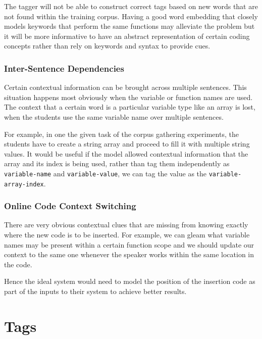 \documentclass[fyp]{socreport}
\begin{document}
The tagger will not be able to construct correct tags based on new words that
are not found within the training corpus. Having a good word embedding that
closely models keywords that perform the same functions may alleviate the problem
but it will be more informative to have an abstract representation of certain
coding concepts rather than rely on keywords and syntax to provide cues.


\subsection{Inter-Sentence Dependencies}
Certain contextual information can be brought across multiple sentences. This
situation happens most obviously when the variable or function names are used.
The context that a certain word is a particular variable type like an array is
lost, when the students use the same variable name over multiple sentences.

For example, in one the given task of the corpus gathering experiments, the
students have to create a string array and proceed to fill it with multiple
string values. It would be useful if the model allowed contextual information
that the array and its index is being used, rather than tag them independently
as \texttt{variable-name} and \texttt{variable-value}, we can tag the value as
the \texttt{variable-array-index}.


\subsection{Online Code Context Switching}
There are very obvious contextual clues that are missing from knowing exactly
where the new code is to be inserted. For example, we can gleam what variable
names may be present within a certain function scope and we should update our
context to the same one whenever the speaker works within the same location in
the code.

Hence the ideal system would need to model the position of the insertion
code as part of the inputs to their system to achieve better results.




\printbibliography[title={Whole bibliography}]

\appendix
\chapter{Tags}
\end{document}
